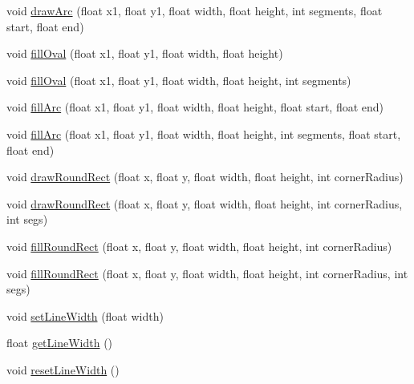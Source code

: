 \begin{DoxyCompactItemize}
\item 
void \mbox{\hyperlink{classorg_1_1newdawn_1_1slick_1_1_graphics_a22999921b60c72db0c2175729761144b}{draw\+Arc}} (float x1, float y1, float width, float height, int segments, float start, float end)
\item 
void \mbox{\hyperlink{classorg_1_1newdawn_1_1slick_1_1_graphics_acdbb1302b137c651486bbdcbcd65d45a}{fill\+Oval}} (float x1, float y1, float width, float height)
\item 
void \mbox{\hyperlink{classorg_1_1newdawn_1_1slick_1_1_graphics_aa0310591aec23a52b04d4506c723af53}{fill\+Oval}} (float x1, float y1, float width, float height, int segments)
\item 
void \mbox{\hyperlink{classorg_1_1newdawn_1_1slick_1_1_graphics_a6edeaec933b806a6a989023395d9b66e}{fill\+Arc}} (float x1, float y1, float width, float height, float start, float end)
\item 
void \mbox{\hyperlink{classorg_1_1newdawn_1_1slick_1_1_graphics_aad986b9698f7dce48b8d1d0a0b6e8cce}{fill\+Arc}} (float x1, float y1, float width, float height, int segments, float start, float end)
\item 
void \mbox{\hyperlink{classorg_1_1newdawn_1_1slick_1_1_graphics_a1c7cf3f9fa7597af33ec6ae4567a1cc2}{draw\+Round\+Rect}} (float x, float y, float width, float height, int corner\+Radius)
\item 
void \mbox{\hyperlink{classorg_1_1newdawn_1_1slick_1_1_graphics_a33e5fb4b514bf003ef2c59ffbe8f8593}{draw\+Round\+Rect}} (float x, float y, float width, float height, int corner\+Radius, int segs)
\item 
void \mbox{\hyperlink{classorg_1_1newdawn_1_1slick_1_1_graphics_a426751430427e05132426a72f3b30de1}{fill\+Round\+Rect}} (float x, float y, float width, float height, int corner\+Radius)
\item 
void \mbox{\hyperlink{classorg_1_1newdawn_1_1slick_1_1_graphics_a7a41e6b2bdaf524881dcf13b67705171}{fill\+Round\+Rect}} (float x, float y, float width, float height, int corner\+Radius, int segs)
\item 
void \mbox{\hyperlink{classorg_1_1newdawn_1_1slick_1_1_graphics_af12d5c2e195b3c952e28b0c54e880ae8}{set\+Line\+Width}} (float width)
\item 
float \mbox{\hyperlink{classorg_1_1newdawn_1_1slick_1_1_graphics_a76e5de3b826bc9542b0b70fc12dd4f14}{get\+Line\+Width}} ()
\item 
void \mbox{\hyperlink{classorg_1_1newdawn_1_1slick_1_1_graphics_a439e42acc146d93467fb7a981cdb7caa}{reset\+Line\+Width}} ()

\end{DoxyCompactItemize}
